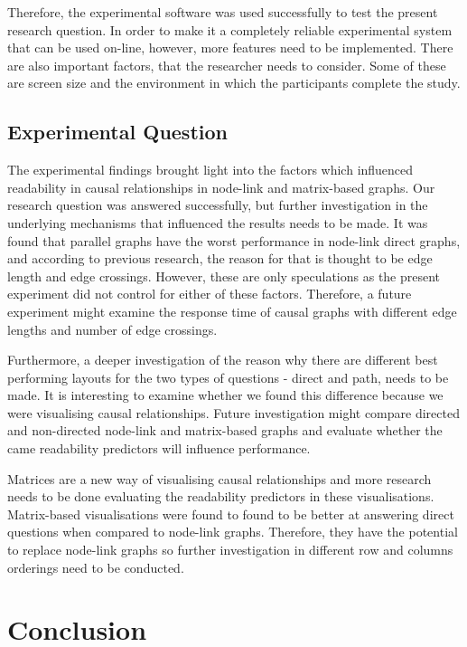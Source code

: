 \documentclass{l4proj}
\begin{document}
Therefore, the experimental software was used successfully to test the present research question. In order to make it a completely reliable experimental system that can be used on-line, however, more features need to be implemented. There are also important factors, that the researcher needs to consider. Some of these are screen size and the environment in which the participants complete the study.

\subsection{Experimental Question}

The experimental findings brought light into the factors which influenced readability in causal relationships in node-link and matrix-based graphs. Our research question was answered successfully, but further investigation in the underlying mechanisms that influenced the results needs to be made. It was found that parallel graphs have the worst performance in node-link direct graphs, and according to previous research, the reason for that is thought to be edge length and edge crossings. However, these are only speculations as the present experiment did not control for either of these factors. Therefore, a future experiment might examine the response time of causal graphs with different edge lengths and number of edge crossings. 

Furthermore, a deeper investigation of the reason why there are different best performing layouts for the two types of questions - direct and path, needs to be made. It is interesting to examine whether we found this difference because we were visualising causal relationships. Future investigation might compare directed and non-directed node-link and matrix-based graphs and evaluate whether the came readability predictors will influence performance.

Matrices are a new way of visualising causal relationships and more research needs to be done evaluating the readability predictors in these visualisations. Matrix-based visualisations were found to found to be better at answering direct questions when compared to node-link graphs. Therefore, they have the potential to replace node-link graphs so further investigation in different row and columns orderings need to be conducted. 

\section{Conclusion}
\end{document}
